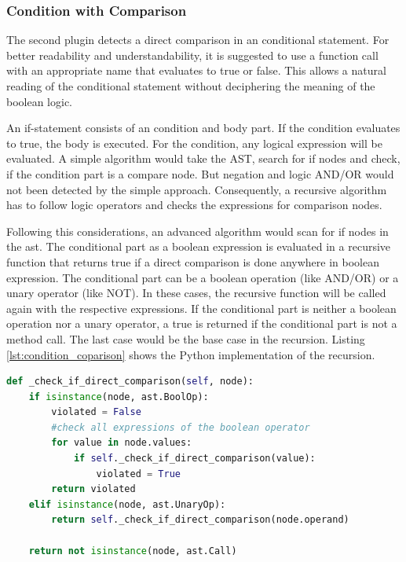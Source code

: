 \subsubsection{Condition with Comparison}
The second plugin detects a direct comparison in an conditional statement. For better readability and understandability, it is suggested to use a function call with an appropriate name that evaluates to true or false. This allows a natural reading of the conditional statement without deciphering the meaning of the boolean logic.

An if-statement consists of an condition and body part. If the condition evaluates to true, the body is executed. For the condition, any logical expression will be evaluated. A simple algorithm would take the AST, search for if nodes and check, if the condition part is a compare node. 
But negation and logic AND/OR would not been detected by the simple approach. Consequently, a recursive algorithm has to follow logic operators and checks the expressions for comparison nodes.

Following this considerations, an advanced algorithm would scan for if nodes in the ast. The conditional part as a boolean expression is evaluated in a recursive function that returns true if a direct comparison is done anywhere in boolean expression.
The conditional part can be a boolean operation (like AND/OR) or a unary operator (like NOT).  In these cases, the recursive function will be called again with the respective expressions. If the conditional part is neither a boolean operation nor a unary operator, a true is returned if the conditional part is not a method call. The last case would be the base case in the recursion. Listing \ref{lst:condition_coparison} shows the Python implementation of the recursion.

\begin{lstlisting}[language=Python, label=lst:condition_coparison, caption={Recursive function to analyse an if statement for direct comparisons. Since a condition should contain a method call, the function returns False if this is not the case.}]
def _check_if_direct_comparison(self, node):
    if isinstance(node, ast.BoolOp):
        violated = False
        #check all expressions of the boolean operator
        for value in node.values:
            if self._check_if_direct_comparison(value):
                violated = True
        return violated
    elif isinstance(node, ast.UnaryOp):
        return self._check_if_direct_comparison(node.operand)

    return not isinstance(node, ast.Call)
    \end{lstlisting}

